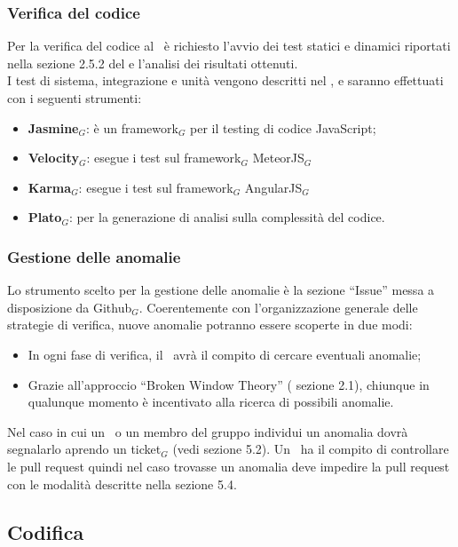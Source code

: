 \subsubsection{Verifica del codice}
Per la verifica del codice al \ruoloVerificatore\ è richiesto l'avvio dei test statici e dinamici riportati nella sezione 2.5.2 del \PdQ{} e l'analisi dei risultati ottenuti. \\
I test di sistema, integrazione e unità vengono descritti nel \PdQ{}, e saranno effettuati con i seguenti strumenti:
\begin{itemize}
\item \textbf{Jasmine}$_G$: è un framework$_G$ per il testing di codice JavaScript;
\item \textbf{Velocity}$_G$: esegue i test sul framework$_G$ MeteorJS$_G$
\item \textbf{Karma}$_G$: esegue i test sul framework$_G$ AngularJS$_G$
\item \textbf{Plato}$_G$: per la generazione di analisi sulla complessità del codice.
\end{itemize}

\subsubsection{Gestione delle anomalie}

Lo strumento scelto per la gestione delle anomalie è la sezione ``Issue'' messa a disposizione da Github$_G$. Coerentemente con l'organizzazione generale delle strategie di verifica, nuove anomalie potranno essere scoperte in due modi:

\begin{itemize}
	\item In ogni fase di verifica, il \ruoloVerificatore\ avrà il compito di cercare eventuali anomalie;
	\item Grazie all'approccio ``Broken Window Theory'' (\PdQ{} sezione 2.1), chiunque in qualunque momento è incentivato alla ricerca di possibili anomalie.
\end{itemize}
Nel caso in cui un \ruoloVerificatore\ o un membro del gruppo individui un anomalia dovrà segnalarlo aprendo un ticket$_G$ (vedi sezione 5.2). Un \ruoloVerificatore\ ha il compito di controllare le pull request quindi nel caso trovasse un anomalia deve impedire la pull request con le modalità descritte nella sezione 5.4.

\subsection{Codifica}
